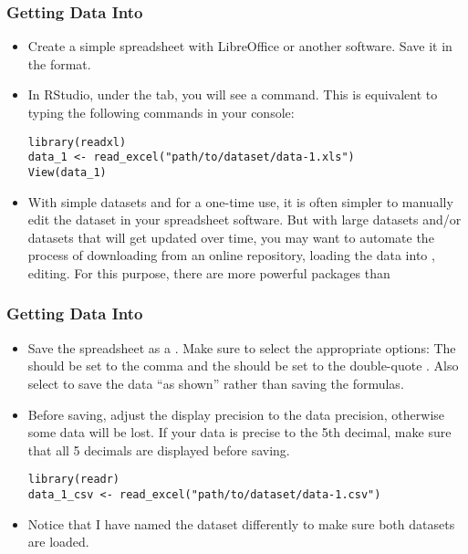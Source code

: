\begin{frame}[fragile]%
\frametitle{Getting Data Into \Rlogo}
\begin{itemize}
\item Create a simple spreadsheet with LibreOffice or another software. Save it in the  format. 
\item In RStudio, under the  tab, you will see a  command. This is equivalent to typing the following commands in your console:
\begin{lstlisting}
library(readxl)
data_1 <- read_excel("path/to/dataset/data-1.xls")
View(data_1)
\end{lstlisting}
\item With simple datasets and for a one-time use, it is often simpler to manually edit the dataset in your spreadsheet software. But with large datasets and/or datasets that will get updated over time, you may want to automate the process of downloading from an online repository, loading the data into \Rlogo, editing. For this purpose, there are more powerful packages than 
\end{itemize}
\end{frame}


\begin{frame}[fragile]%
\frametitle{Getting Data Into \Rlogo}
\begin{itemize}
\item Save the spreadsheet as a . Make sure to select the appropriate options: The  should be set to the comma \R{,} and the  should be set to the double-quote . Also select to save the data ``as shown'' rather than saving the formulas. 
\item Before saving, adjust the display precision to the data precision, otherwise some data will be lost. If your data is precise to the 5th decimal, make sure that all 5 decimals are displayed before saving. 
\begin{lstlisting}
library(readr)
data_1_csv <- read_excel("path/to/dataset/data-1.csv")
\end{lstlisting}
\item Notice that I have named the dataset differently to make sure both datasets are loaded. 
\end{itemize}
\end{frame}



